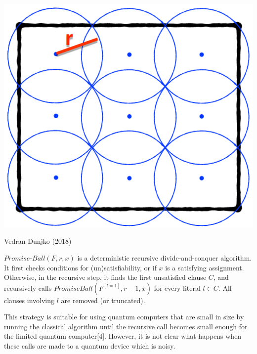 \documentclass[portrait,a0paper,fontscale=0.285]{baposter} %
\begin{document}
\begin{poster}
{\begin{center}
	\vspace{-0.8em}
	\includegraphics[scale=0.168]{PromiseBall.png}

	\begin{tiny}Vedran Dunjko (2018)\end{tiny}
	\vspace{-0.8em}
\end{center}
$Promise$-$Ball(F,r,x)$ is a deterministic recursive divide-and-conquer algorithm. It first checks conditions for (un)satisfiability, or if $x$ is a satisfying assignment. Otherwise, in the recursive step, it finds the first unsatisfied clause $C$, and recursively calls $PromiseBall(F^{[l=1]},r−1,x)$ for every literal $l\in C$. All clauses involving $l$ are removed (or truncated).

This strategy is suitable for using quantum computers that are small in size by running the classical algorithm until the recursive call becomes small enough for the limited quantum computer[4]. However, it is not clear what happens when these calls are made to a quantum device which is noisy.

	
}


\end{poster}
\end{document}
